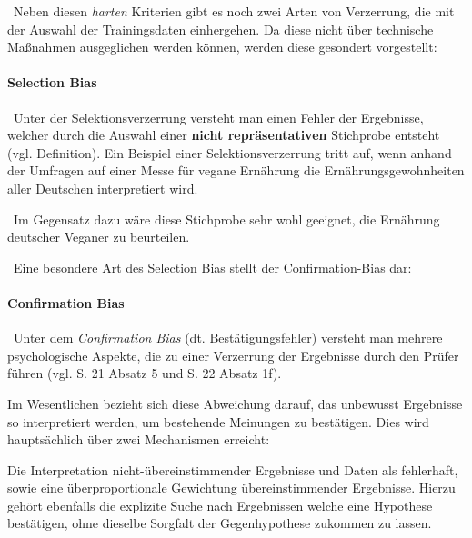 ~\newline Neben diesen \textit{harten} Kriterien gibt es noch zwei Arten von Verzerrung, die mit der Auswahl der Trainingsdaten einhergehen. Da diese nicht über technische Maßnahmen ausgeglichen werden können, werden diese gesondert vorgestellt:
\paragraph{Selection Bias} ~\newline  Unter der Selektionsverzerrung versteht man einen Fehler der Ergebnisse, welcher durch die Auswahl einer \textbf{nicht repräsentativen} Stichprobe entsteht (vgl. \cite{SelectionBias} Definition). Ein Beispiel einer Selektionsverzerrung tritt auf, wenn anhand der Umfragen auf einer Messe für vegane Ernährung die Ernährungsgewohnheiten aller Deutschen interpretiert wird. 

~\newline  Im Gegensatz dazu wäre diese Stichprobe sehr wohl geeignet, die Ernährung deutscher Veganer zu beurteilen.  

~\newline Eine besondere Art des Selection Bias stellt der Confirmation-Bias dar:
\paragraph{Confirmation Bias} ~\newline  Unter dem \textit{Confirmation Bias} (dt. Bestätigungsfehler) versteht man mehrere psychologische Aspekte, die zu einer Verzerrung der Ergebnisse durch den Prüfer führen (vgl. \cite{ConfirmationBias} S. 21 Absatz 5 und S. 22 Absatz 1f). 

Im Wesentlichen bezieht sich diese Abweichung darauf, das unbewusst Ergebnisse so interpretiert werden, um bestehende Meinungen zu bestätigen. Dies wird hauptsächlich über zwei Mechanismen erreicht: 

Die Interpretation nicht-übereinstimmender Ergebnisse und Daten als fehlerhaft, sowie eine überproportionale Gewichtung übereinstimmender Ergebnisse. Hierzu gehört ebenfalls die explizite Suche nach Ergebnissen welche eine Hypothese bestätigen, ohne dieselbe Sorgfalt der Gegenhypothese zukommen zu lassen. 
